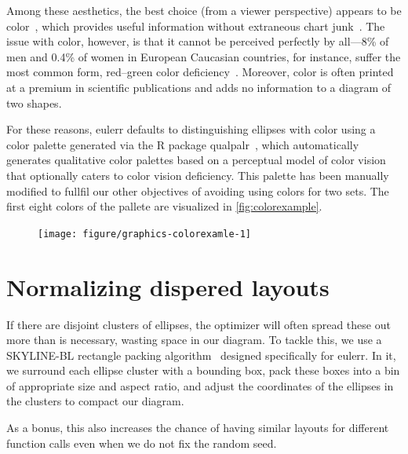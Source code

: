 \documentclass[
  oneside,
  openany,
  numbers=noendperiod,
  parskip=half,
  bibliography=totoc
]{scrbook}\usepackage[]{graphicx}\usepackage{xcolor}
\newenvironment{knitrout}{}{} %
\newcommand{\pkg}[1]{{\fontseries{b}\selectfont #1}}
\begin{document}
Among these aesthetics, the best choice (from a viewer perspective) appears to
be color~\citep{blake_2016}, which provides useful information without
extraneous chart junk~\citep{tufte_2001}. The issue with color, however, is that
it cannot be perceived perfectly by all---8\% of men and 0.4\% of women in
European Caucasian countries, for instance, suffer the most common form,
red--green color deficiency~\cite{Birch_2012}. Moreover, color
is often printed at a premium in scientific publications and adds no information
to a diagram of two shapes.

For these reasons, \pkg{eulerr} defaults to distinguishing ellipses with color
using a color palette generated via the R package
\pkg{qualpalr}~\citep{larsson_2016}, which automatically generates qualitative
color palettes based on a perceptual model of color vision that optionally
caters to color vision deficiency. This palette has been manually modified
to fullfil our other objectives of avoiding using colors for two
sets. The first eight colors of the pallete are visualized in
\cref{fig:colorexample}.

\begin{figure}[htbp]
\begin{knitrout}\small
{}\color{fgcolor}

{\centering \texttt{[image: figure/graphics-colorexamle-1]} 

}



\end{knitrout}
\end{figure}

\section{Normalizing dispered layouts}
\label{sec:layout}

If there are disjoint clusters of ellipses, the optimizer will often
spread these out more than is necessary, wasting space in our diagram. To
tackle this, we
use a SKYLINE-BL rectangle packing algorithm~\citep{jylaenki_2010}
designed specifically for \pkg{eulerr}. In it, we surround each ellipse cluster
with a bounding box, pack these boxes into a bin of appropriate size and
aspect ratio, and adjust the coordinates of the ellipses in the clusters to
compact our diagram.

As a bonus, this also increases the chance of having
similar layouts for different function calls even when we do not
fix the random seed.
\end{document}
